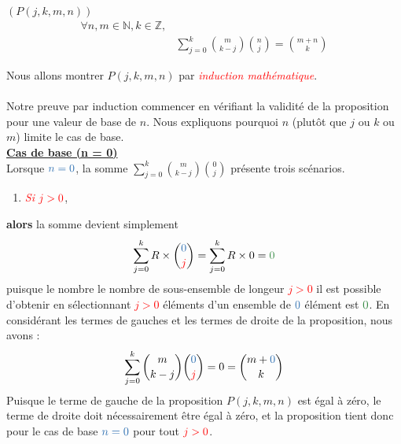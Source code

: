 \documentclass[16pt]{report}
\begin{document}
\begin{multicols*}{2}
    \begin{prop}{$\left(P(j, k , m,  n)\right)$}{}
    \begin{align*}
        \forall n, m \in \mathbb{N}, k \in \mathbb{Z},&
             \\ 
                         &\sum_{j=0}^{k} {m \choose k-j} {n \choose j} = {m+n \choose k}
    \end{align*}       
    \end{prop}

    \begin{Preuve*}{}{}
        Nous allons montrer $P(j, k, m, n)$ par \textit{\textcolor{red}{induction mathématique}}.   

        \paragraph{}
        Notre preuve par induction commencer en vérifiant la validité de la proposition pour 
        une valeur de base de $n$. Nous expliquons pourquoi $n$ (plutôt que $j$ ou $k$ ou $m$) 
        limite le cas de base. \vspace{1em} \\ 
        \underline{\textbf{Cas de base (n = 0)}}\\
        Lorsque $\textcolor{myb}{n = 0}$, la somme $\sum_{j=0}^{k}{m \choose k-j}{0 \choose j}$ 
        présente trois scénarios. \\ 
        \begin{enumerate}
            \item \textit{\textcolor{red}{Si}} $\textcolor{red}{j > 0}$,
        \end{enumerate}
         \textbf{alors} la somme devient simplement 
        \[ \sum_{j=0}^{k} R \times {\textcolor{myb}{0} \choose \textcolor{red}{j}} = 
        \sum_{j=0}^{k}R \times 0 = \textcolor{myg}{0}\]
        puisque le nombre \textcolor{myg}{le nombre de sous-ensemble} de longeur \textcolor{red}{$j > 0$}
        il est possible d'obtenir en sélectionnant \textcolor{red}{$j > 0$} éléments 
        d'un ensemble de $\textcolor{myb}{0}$  élément est $\textcolor{myg}{0}$. En considérant 
        les termes de gauches et les termes de droite de la proposition, 
        nous avons : 
        \[ \sum_{j=0}^{k} {m \choose k - j}{\textcolor{myb}{0} \choose \textcolor{red}{j}} = 0 
        = {m + \textcolor{myb}{0} \choose k} \]
        Puisque le terme de gauche de la proposition $P(j,k,m,n)$ est égal à zéro, 
        le terme de droite doit nécessairement être égal à zéro, et la proposition 
        tient donc pour le cas de base $\textcolor{myb}{n = 0}$ pour tout $\textcolor{red}{j > 0}$. 


\end{Preuve*}
\end{multicols*}
\end{document}
